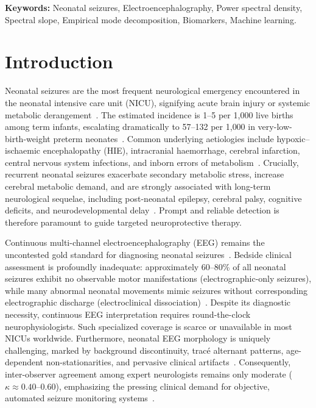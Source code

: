 \documentclass[10pt,twocolumn,letterpaper]{article}
\begin{document}
\vspace{0.5em}
\noindent\textbf{Keywords:} Neonatal seizures, Electroencephalography, Power spectral density, Spectral slope, Empirical mode decomposition, Biomarkers, Machine learning.

\section{Introduction}\label{sec:intro}

Neonatal seizures are the most frequent neurological emergency encountered in the neonatal intensive care unit (NICU), signifying acute brain injury or systemic metabolic derangement~\cite{glass2016,boylan2013}. The estimated incidence is 1--5 per 1{,}000 live births among term infants, escalating dramatically to 57--132 per 1{,}000 in very-low-birth-weight preterm neonates~\cite{glass2016,lloyd2021}. Common underlying aetiologies include hypoxic--ischaemic encephalopathy (HIE), intracranial haemorrhage, cerebral infarction, central nervous system infections, and inborn errors of metabolism~\cite{ronen2007}. Crucially, recurrent neonatal seizures exacerbate secondary metabolic stress, increase cerebral metabolic demand, and are strongly associated with long-term neurological sequelae, including post-neonatal epilepsy, cerebral palsy, cognitive deficits, and neurodevelopmental delay~\cite{glass2009,ronen2007}. Prompt and reliable detection is therefore paramount to guide targeted neuroprotective therapy.

Continuous multi-channel electroencephalography (EEG) remains the uncontested gold standard for diagnosing neonatal seizures~\cite{shellhaas2011,boylan2013}. Bedside clinical assessment is profoundly inadequate: approximately 60--80\% of all neonatal seizures exhibit no observable motor manifestations (electrographic-only seizures), while many abnormal neonatal movements mimic seizures without corresponding electrographic discharge (electroclinical dissociation)~\cite{murray2008}. Despite its diagnostic necessity, continuous EEG interpretation requires round-the-clock neurophysiologists. Such specialized coverage is scarce or unavailable in most NICUs worldwide. Furthermore, neonatal EEG morphology is uniquely challenging, marked by background discontinuity, tracé alternant patterns, age-dependent non-stationarities, and pervasive clinical artifacts~\cite{stevenson2015}. Consequently, inter-observer agreement among expert neurologists remains only moderate ($\kappa \approx 0.40$--$0.60$), emphasizing the pressing clinical demand for objective, automated seizure monitoring systems~\cite{stevenson2015,mathieson2016}.
\end{document}

